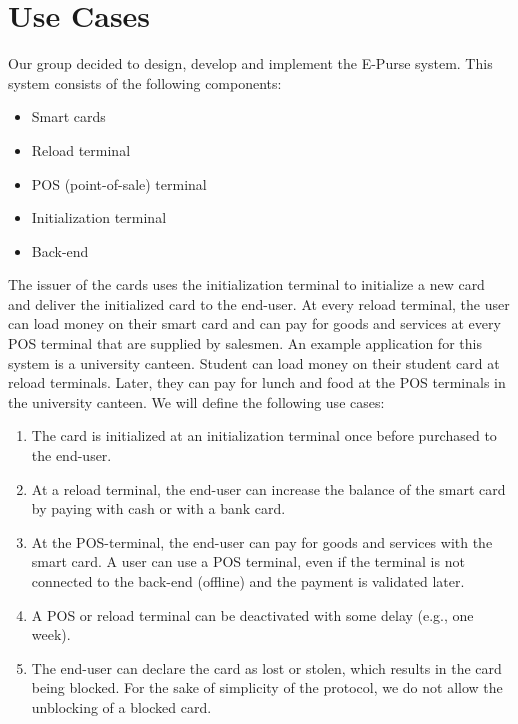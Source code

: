 


\maketitle



\section{Use Cases}
Our group decided to design, develop and implement the E-Purse system.
This system consists of the following components:
\begin{itemize}
    \item Smart cards
    \item Reload terminal
    \item POS (point-of-sale) terminal
    \item Initialization terminal
    \item Back-end
\end{itemize}
The issuer of the cards uses the initialization terminal to initialize a new card and deliver the initialized card to the end-user.
At every reload terminal, the user can load money on their smart card and can pay for goods and services at every POS terminal that are supplied by salesmen.
An example application for this system is a university canteen.
Student can load money on their student card at reload terminals.
Later, they can pay for lunch and food at the POS terminals in the university canteen.
We will define the following use cases:
\begin{enumerate}[label={UC\arabic*:}, ref={UC\arabic*}, leftmargin=3\parindent]
    \item \label{uc:person} The card is initialized at an initialization terminal once before purchased to the end-user.
    
    \item \label{uc:reload} At a reload terminal, the end-user can increase the balance of the smart card by paying with cash or with a bank card.
    
    \item \label{uc:payment} At the POS-terminal, the end-user can pay for goods and services with the smart card.
    A user can use a POS terminal, even if the terminal is not connected to the back-end (offline) and the payment is validated later.

    \item A POS or reload terminal can be deactivated with some delay (e.g., one week).
    
    \item The end-user can declare the card as lost or stolen, which results in the card being blocked.
    For the sake of simplicity of the protocol, we do not allow the unblocking of a blocked card.
    
\end{enumerate}
